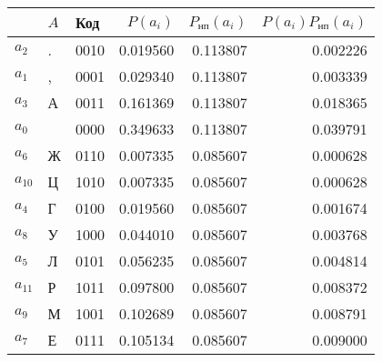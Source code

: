 \begin{tabular}{lllrrr}
\toprule
 & $A$ & Код & $P(a_i)$ & $P_{\text{нп}}(a_i)$ & $P(a_i)P_{\text{нп}}(a_i)$ \\
\midrule
$a_{2}$ & . & 0010 & 0.019560 & 0.113807 & 0.002226 \\
$a_{1}$ & , & 0001 & 0.029340 & 0.113807 & 0.003339 \\
$a_{3}$ & А & 0011 & 0.161369 & 0.113807 & 0.018365 \\
$a_{0}$ &   & 0000 & 0.349633 & 0.113807 & 0.039791 \\
$a_{6}$ & Ж & 0110 & 0.007335 & 0.085607 & 0.000628 \\
$a_{10}$ & Ц & 1010 & 0.007335 & 0.085607 & 0.000628 \\
$a_{4}$ & Г & 0100 & 0.019560 & 0.085607 & 0.001674 \\
$a_{8}$ & У & 1000 & 0.044010 & 0.085607 & 0.003768 \\
$a_{5}$ & Л & 0101 & 0.056235 & 0.085607 & 0.004814 \\
$a_{11}$ & Р & 1011 & 0.097800 & 0.085607 & 0.008372 \\
$a_{9}$ & М & 1001 & 0.102689 & 0.085607 & 0.008791 \\
$a_{7}$ & Е & 0111 & 0.105134 & 0.085607 & 0.009000 \\
\bottomrule
\end{tabular}
